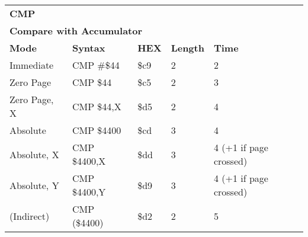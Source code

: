 \begin{table}[H]
\begin{tabular}{p{}p{}p{}p{}p{}}
\multicolumn{5}{p{0.22\textwidth}}{\huge\textbf{CMP}}\\
\multicolumn{5}{p{0.9\textwidth}}{\textbf{Compare with Accumulator}}\\ \hline
\multicolumn{1}{|p{0.22\textwidth}|}{\textbf{Mode}}&\multicolumn{1}{|p{0.2\textwidth}|}{\textbf{Syntax}}&\multicolumn{1}{|p{0.1\textwidth}|}{\textbf{HEX}}&\multicolumn{1}{|p{0.1\textwidth}|}{\textbf{Length}}&\multicolumn{1}{|p{0.4\textwidth}|}{\textbf{Time}}\\ \hline
\multicolumn{1}{|p{0.22\textwidth}|}{Immediate}&\multicolumn{1}{|p{0.2\textwidth}|}{CMP \#\$44}&\multicolumn{1}{|p{0.1\textwidth}|}{\$c9}&\multicolumn{1}{|p{0.1\textwidth}|}{2}&\multicolumn{1}{|p{0.4\textwidth}|}{2}\\ \hline
\multicolumn{1}{|p{0.22\textwidth}|}{Zero Page}&\multicolumn{1}{|p{0.2\textwidth}|}{CMP \$44}&\multicolumn{1}{|p{0.1\textwidth}|}{\$c5}&\multicolumn{1}{|p{0.1\textwidth}|}{2}&\multicolumn{1}{|p{0.4\textwidth}|}{3}\\ \hline
\multicolumn{1}{|p{0.22\textwidth}|}{Zero Page, X}&\multicolumn{1}{|p{0.2\textwidth}|}{CMP \$44,X}&\multicolumn{1}{|p{0.1\textwidth}|}{\$d5}&\multicolumn{1}{|p{0.1\textwidth}|}{2}&\multicolumn{1}{|p{0.4\textwidth}|}{4}\\ \hline
\multicolumn{1}{|p{0.22\textwidth}|}{Absolute}&\multicolumn{1}{|p{0.2\textwidth}|}{CMP \$4400}&\multicolumn{1}{|p{0.1\textwidth}|}{\$cd}&\multicolumn{1}{|p{0.1\textwidth}|}{3}&\multicolumn{1}{|p{0.4\textwidth}|}{4}\\ \hline
\multicolumn{1}{|p{0.22\textwidth}|}{Absolute, X}&\multicolumn{1}{|p{0.2\textwidth}|}{CMP \$4400,X}&\multicolumn{1}{|p{0.1\textwidth}|}{\$dd}&\multicolumn{1}{|p{0.1\textwidth}|}{3}&\multicolumn{1}{|p{0.4\textwidth}|}{4 (+1 if page crossed)}\\ \hline
\multicolumn{1}{|p{0.22\textwidth}|}{Absolute, Y}&\multicolumn{1}{|p{0.2\textwidth}|}{CMP \$4400,Y}&\multicolumn{1}{|p{0.1\textwidth}|}{\$d9}&\multicolumn{1}{|p{0.1\textwidth}|}{3}&\multicolumn{1}{|p{0.4\textwidth}|}{4 (+1 if page crossed)}\\ \hline
\multicolumn{1}{|p{0.22\textwidth}|}{(Indirect)}&\multicolumn{1}{|p{0.2\textwidth}|}{CMP (\$4400)}&\multicolumn{1}{|p{0.1\textwidth}|}{\$d2}&\multicolumn{1}{|p{0.1\textwidth}|}{2}&\multicolumn{1}{|p{0.4\textwidth}|}{5}\\ \hline

\end{tabular}
\end{table}
